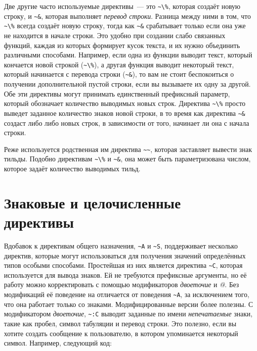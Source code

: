 Две другие часто используемые директивы~--- это \lstinline!~\%!, которая создаёт новую
строку, и \lstinline!~&!, которая выполняет \textit{перевод строки}. Разница между ними в
том, что \lstinline!~\%! всегда создаёт новую строку, тогда как \lstinline!~&!
срабатывает только если она уже не находится в начале строки. Это удобно при создании
слабо связанных функций, каждая из которых формирует кусок текста, и их нужно объединить
различными способами. Например, если одна из функции выводит текст, который кончается
новой строкой (\lstinline!~\%!), а другая функция выводит некоторый текст, который
начинается с перевода строки (\lstinline!~&!), то вам не стоит беспокоиться о получении
дополнительной пустой строки, если вы вызываете их одну за другой. Обе эти директивы могут
принимать единственный префиксный параметр, который обозначает количество выводимых новых
строк. Директива \lstinline!~\%! просто выведет заданное количество знаков новой строки, в
то время как директива \lstinline!~&! создаст либо  либо  новых строк,
в зависимости от того, начинает ли она с начала строки.

Реже используется родственная им директива \lstinline!~~!, которая заставляет
 вывести знак тильды. Подобно директивам \lstinline!~\%! и \lstinline!~&!,
она может быть параметризована числом, которое задаёт количество выводимых тильд.

\section{Знаковые и целочисленные директивы}

Вдобавок к директивам общего назначения, \lstinline!~A! и \lstinline!~S!, 
поддерживает несколько директив, которые могут использоваться для получения значений
определённых типов особыми способами. Простейшая из них является директива \lstinline!~C!,
которая используется для вывода знаков. Ей не требуются префиксные аргументы, но её работу
можно корректировать с помощью модификаторов \textit{двоеточие} и \textit{@}. Без
модификаций её поведение на отличается от поведения \lstinline!~A!, за исключением того,
что она работает только со знаками. Модифицированные версии более полезны. С модификатором
\textit{двоеточие}, \lstinline!~:C! выводит заданные по имени \textit{непечатаемые} знаки,
такие как пробел, символ табуляции и перевод строки. Это полезно, если вы хотите создать
сообщение к пользователю, в котором упоминается некоторый символ. Например, следующий код:


